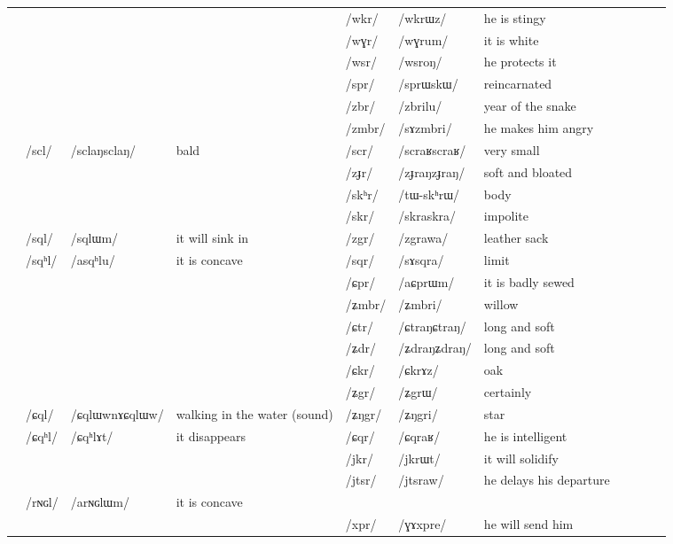 \documentclass[oldfontcommands,oneside,a4paper,11pt]{article}
\newcommand{\ipa}[1]{/#1/} %
\newcommand{\tib}[1]{\cellcolor{lightgray}\textbf{#1}}
\newcommand{\idph}[1]{\cellcolor{gray}\textbf{#1}}
\begin{document}
\begin{table}
{\begin{tabular}{l|lll|lll|lll|l}
\midrule
&&&&	\ipa{wkr}  & 	\ipa{wkrɯz}  &he is stingy \\
&&&&	\ipa{wɣr}  &	\ipa{wɣrum}  &it is white	\\
&&&  &	\ipa{wsr}  &	\ipa{wsroŋ}  &he protects it	\\
\midrule
&	&	&	&	\ipa{spr}  & 	\ipa{sprɯskɯ}  & 	 reincarnated	\\
&	&	&	&	\ipa{zbr}  \tib{} & 	\ipa{zbrilu}  & year of the snake	 	\\
&	&	&	&	\ipa{zmbr}  & 	\ipa{sɤzmbri}  & 	he makes him angry	\\
&	\ipa{scl}  \idph{}& 	\ipa{sclaŋsclaŋ}  & bald	&	\ipa{scr}  \idph{}& 	\ipa{scraʁscraʁ}  & 	very small&	\\
&	&	&	&	\ipa{zɟr} \idph{} & 	\ipa{zɟraŋzɟraŋ}  & 	soft and bloated	\\
&	&	&	&	\ipa{skʰr}  & 	\ipa{tɯ-skʰrɯ}  & 	body 	\\
&	&	&	&	\ipa{skr}  & 	\ipa{skraskra}  & impolite	 	\\
&	\ipa{sql}  & 	\ipa{sqlɯm}  &it will sink in 	&	\ipa{zgr} \tib{} & 	\ipa{zgrawa}    	&	leather sack\\
&	\ipa{sqʰl}  & 	\ipa{asqʰlu}  &it is concave 	&	\ipa{sqr}  & 	\ipa{sɤsqra}   	&	limit\\
\midrule
&	&	&	&	\ipa{ɕpr}  & 	\ipa{aɕprɯm}  & it is badly sewed	\\
&	&	&	&	\ipa{ʑmbr}  & 	\ipa{ʑmbri}  & willow	\\
&	&	&	&	\ipa{ɕtr}  \idph{}& 	\ipa{ɕtraŋɕtraŋ}  & long and soft	\\
&	&	&	&	\ipa{ʑdr}  \idph{}& 	\ipa{ʑdraŋʑdraŋ}  & 	 long and soft	\\
&	&	&	&	\ipa{ɕkr}  & 	\ipa{ɕkrɤz}  &oak 	\\
&	&	&	&	\ipa{ʑgr}  & 	\ipa{ʑgrɯ}  &certainly 	\\
&	\ipa{ɕql}  \idph{}& 	\ipa{ɕqlɯwnɤɕqlɯw}  &  walking in the water 	(sound)&	\ipa{ʑŋgr}  & 	\ipa{ʑŋgri}  &star 	\\
&	\ipa{ɕqʰl}  & 	\ipa{ɕqʰlɤt}  &it disappears 	&	\ipa{ɕqr}  & 	\ipa{ɕqraʁ}  & 	he is intelligent \\
\midrule						
&	&	&	&	\ipa{jkr}  & 	\ipa{jkrɯt}  & it will solidify \\
&	&	&	&\ipa{jtsr}  & 	\ipa{jtsraw}  &he delays his departure \\
	\midrule	
&	 	\ipa{rɴɢl}  & 	\ipa{arɴɢlɯm}  &it is concave &&&\\
&	&	&	& \ipa{xpr}  & 	\ipa{ɣɤxpre}  &he will send him \\

\end{tabular}}
\end{table}
\end{document}
